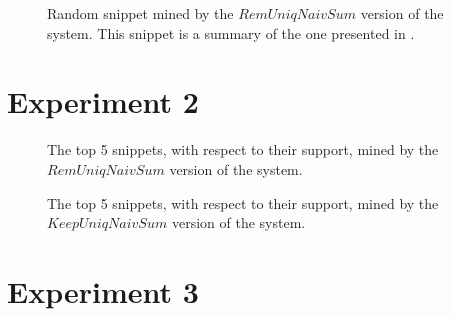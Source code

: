 \vspace{-10pt}

\begin{figure}[!h]

\vspace{-10pt}
\caption[Random snippet mined by the $RemUniqNaivSum$ version of the\protect\\system]{Random snippet mined by the $RemUniqNaivSum$ version of the system. This snippet is a summary of the one presented in .}
\label{listings:exp1-ex2-sum-java}
\end{figure}

\clearpage

\section{Experiment 2}
\label{sec:exp2-qualitative}

\begin{figure}[!h]

\vspace{-10pt}
\caption[Top 5 snippets mined by the $RemUniqNaivSum$ version of the system]{The top 5 snippets, with respect to their support, mined by the $RemUniqNaivSum$ version of the system.}
\label{listings:exp2-rem-unique-top-examples}
\end{figure}

\vspace{-10pt}

\begin{figure}[!h]

\vspace{-10pt}
\caption[Top 5 snippets mined by the $KeepUniqNaivSum$ version of the system]{The top 5 snippets, with respect to their support, mined by the $KeepUniqNaivSum$ version of the system.}
\label{listings:exp2-keep-unique-top-examples}
\end{figure}

\clearpage

\section{Experiment 3}
\label{sec:exp3-qualitative}

